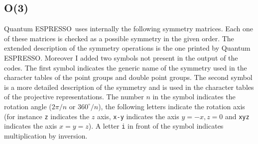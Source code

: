 \documentclass[12pt,a4paper]{article}
\def\qe{{\sc Quantum ESPRESSO}}
\begin{document}
\subsection{\color{web-blue}O(3)}
\qe\ uses internally the following symmetry matrices. Each one of these
matrices is checked as a possible symmetry in the given order. The extended
description of the symmetry operations is the one printed by \qe. Moreover
I added two symbols not present in the output of the codes. The
first symbol indicates the generic name of the symmetry used in the character
tables of the point groups and double point groups. The second symbol is
a more detailed description of the symmetry and is used in the character
tables of the projective representations. The number $n$ in the symbol 
indicates the rotation angle ($2 \pi / n$ or $360^\circ/n$), the following
letters indicate the rotation axis (for instance \texttt{z} indicates the 
$z$ axis, \texttt{x-y} indicates the axis $y=-x, z=0$ and \texttt{xyz} 
indicates the axis $x=y=z$).
A letter \texttt{i} in front of the symbol indicates multiplication 
by inversion.
\end{document}
